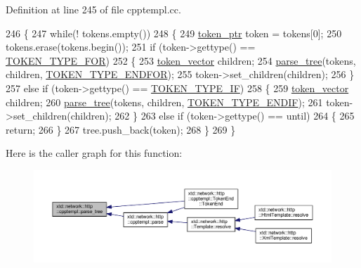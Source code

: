 Definition at line 245 of file cpptempl.\+cc.


\begin{DoxyCode}
246 \{
247   \textcolor{keywordflow}{while}(! tokens.empty())
248   \{
249     \hyperlink{namespacextd_1_1network_1_1http_1_1cpptempl_a09d1bd238d03342e60f0c20c679c0c88}{token\_ptr} token = tokens[0];
250     tokens.erase(tokens.begin());
251     \textcolor{keywordflow}{if} (token->gettype() == \hyperlink{namespacextd_1_1network_1_1http_1_1cpptempl_a39833083d228a5b5ef9f6bb7896479eea77914f6881c1bc9ec1910ca843bb6965}{TOKEN\_TYPE\_FOR})
252     \{
253       \hyperlink{namespacextd_1_1network_1_1http_1_1cpptempl_a38606cfbbfe81ed46ea9b0cf064de956}{token\_vector} children;
254       \hyperlink{namespacextd_1_1network_1_1http_1_1cpptempl_a27515db5dde2876849fa316963a67e63}{parse\_tree}(tokens, children, \hyperlink{namespacextd_1_1network_1_1http_1_1cpptempl_a39833083d228a5b5ef9f6bb7896479eea7a23df3b1f7078c58e56a3c51c24948c}{TOKEN\_TYPE\_ENDFOR});
255       token->set\_children(children);
256     \}
257     \textcolor{keywordflow}{else} \textcolor{keywordflow}{if} (token->gettype() == \hyperlink{namespacextd_1_1network_1_1http_1_1cpptempl_a39833083d228a5b5ef9f6bb7896479eea63ca41e19f481129f654b675913cc557}{TOKEN\_TYPE\_IF})
258     \{
259       \hyperlink{namespacextd_1_1network_1_1http_1_1cpptempl_a38606cfbbfe81ed46ea9b0cf064de956}{token\_vector} children;
260       \hyperlink{namespacextd_1_1network_1_1http_1_1cpptempl_a27515db5dde2876849fa316963a67e63}{parse\_tree}(tokens, children, \hyperlink{namespacextd_1_1network_1_1http_1_1cpptempl_a39833083d228a5b5ef9f6bb7896479eea20879254cae890cea9ab4fbdb6223165}{TOKEN\_TYPE\_ENDIF});
261       token->set\_children(children);
262     \}
263     \textcolor{keywordflow}{else} \textcolor{keywordflow}{if} (token->gettype() == until)
264     \{
265       \textcolor{keywordflow}{return};
266     \}
267     tree.push\_back(token);
268   \}
269 \}
\end{DoxyCode}


Here is the caller graph for this function\+:
\nopagebreak
\begin{figure}[H]
\begin{center}
\leavevmode
\includegraphics[width=350pt]{namespacextd_1_1network_1_1http_1_1cpptempl_a27515db5dde2876849fa316963a67e63_icgraph}
\end{center}
\end{figure}


